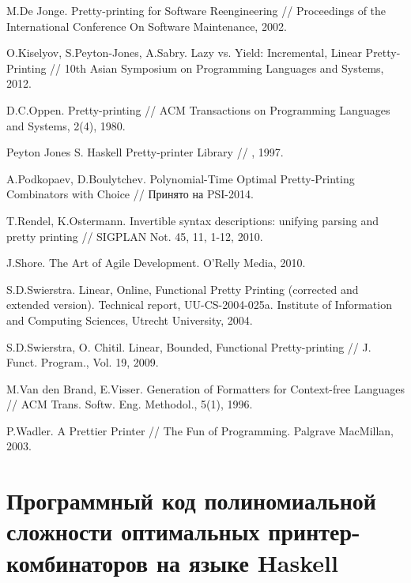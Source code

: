 \begin{thebibliography}{9001}
 M.De Jonge. Pretty-printing for Software Reengineering // Proceedings of the International Conference On Software Maintenance, 2002.

 O.Kiselyov, S.Peyton-Jones, A.Sabry. Lazy vs. Yield: Incremental, Linear Pretty-Printing // 10th Asian Symposium on Programming Languages and Systems, 
2012.

 D.C.Oppen. Pretty-printing // ACM Transactions on Programming Languages and Systems, 2(4), 1980.

 Peyton Jones S. Haskell Pretty-printer Library // , 1997.

 A.Podkopaev, D.Boulytchev.
Polynomial-Time Optimal Pretty-Printing Combinators with Choice // Принято на PSI-2014. 

 T.Rendel, K.Ostermann. Invertible syntax descriptions: unifying parsing and pretty printing // SIGPLAN Not. 45, 11, 1-12, 2010.

 J.Shore. The Art of Agile Development. O'Relly Media, 2010.

 S.D.Swierstra. Linear, Online, Functional Pretty Printing (corrected and extended version).
Technical report, UU-CS-2004-025a. Institute of Information and Computing Sciences, Utrecht University, 2004.

 S.D.Swierstra, O. Chitil. Linear, Bounded, Functional Pretty-printing // J. Funct. Program., Vol. 19,
2009.

 M.Van den Brand, E.Visser. Generation of Formatters for Context-free Languages // ACM Trans. Softw. Eng. Methodol., 5(1), 1996.

 P.Wadler. A Prettier Printer // The Fun of Programming. Palgrave MacMillan, 2003.


\end{thebibliography}

\section*{Программный код полиномиальной сложности оптимальных принтер-комбинаторов на языке Haskell}



